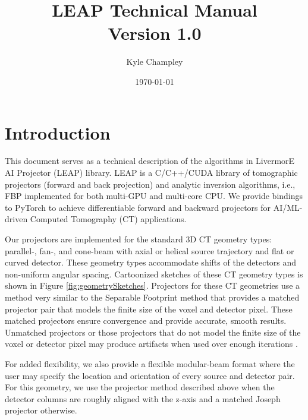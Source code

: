 \documentclass[11pt]{article}
\title{LEAP Technical Manual \\ Version 1.0}
\author{Kyle Champley}
\date{\today}
\begin{document}
\newcommand{\B}[1]{\textbf{#1}}
\newcommand{\ra}{\rightarrow}
\newcommand{\sinc}{\text{sinc}}
\newcommand{\supp}{\text{supp}}
\newcommand{\suppe}{\text{supp}_{\varepsilon}}
\newcommand{\ind}{\B{1}}
\newcommand{\sgn}{\text{sgn}}
\newcommand{\etal}{\text{et al. }}
\newcommand{\Beta}{{\boldsymbol\beta}}
\newcommand{\Radon}{\mathcal{R}}
\newcommand{\Xray}{\mathcal{P}}
\newcommand{\Fourier}{\mathcal{F}}
\newcommand{\Hilbert}{\mathcal{H}}
\newcommand{\Identity}{\mathcal{I}}
\newcommand{\BL}{\mathcal{L}}
\newcommand{\R}{\mathcal{R}}
\newcommand{\Cov}{\text{Cov}}
\newcommand{\argmin}{\operatorname{argmin}}


\maketitle

\newpage
\tableofcontents
\newpage

\section{Introduction}

This document serves as a technical description of the algorithms in LivermorE AI Projector (LEAP) library.  LEAP is a C/C++/CUDA library of tomographic projectors (forward and back projection) and analytic inversion algorithms, i.e., FBP implemented for both multi-GPU and multi-core CPU. We provide bindings to PyTorch to achieve differentiable forward and backward projectors for AI/ML-driven Computed Tomography (CT) applications.

Our projectors are implemented for the standard 3D CT geometry types: parallel-, fan-, and cone-beam with axial or helical source trajectory and flat or curved detector. These geometry types accommodate shifts of the detectors and non-uniform angular spacing. Cartoonized sketches of these CT geometry types is shown in Figure \ref{fig:geometrySketches}. Projectors for these CT geometries use a method very similar to the Separable Footprint method \cite{Long_TMI_2010} that provides a matched projector pair that models the finite size of the voxel and detector pixel. These matched projectors ensure convergence and provide accurate, smooth results. Unmatched projectors or those projectors that do not model the finite size of the voxel or detector pixel may produce artifacts when used over enough iterations \cite{DeManBasu_PMB_2004}.

For added flexibility, we also provide a flexible modular-beam format where the user may specify the location and orientation of every source and detector pair.  For this geometry, we use the projector method described above when the detector columns are roughly aligned with the z-axis and a matched Joseph projector \cite{Joseph_TMI_1982} otherwise.
\end{document}
